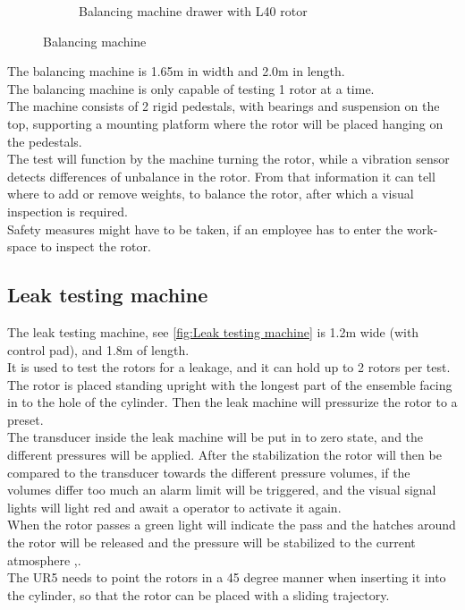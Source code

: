 \begin{figure}[H]
\begin{subfigure}{.49\textwidth}
        \caption{Balancing machine drawer with L40 rotor}
        \label{fig:Rotor} 
    \end{subfigure}
\caption{Balancing machine\cite{Case}}
\label{fig:BalancingMachine}
\end{figure}

 The balancing machine is 1.65m in width and 2.0m in length.\\
 The balancing machine is only capable of testing 1 rotor at a time.\\
 The machine consists of 2 rigid pedestals, with bearings and suspension on the top, supporting a mounting platform where the rotor will be placed hanging on the pedestals. \\

The test will function by the machine turning the rotor, while a vibration sensor detects differences of unbalance in the rotor. From that information it can tell where to add or remove weights, to balance the rotor, after which a visual inspection is required. \\

Safety measures might have to be taken, if an employee has to enter the work-space to inspect the rotor. \\
 


 \subsection{Leak testing machine}
 
 The leak testing machine, see \ref{fig:Leak testing machine} is 1.2m wide (with control pad), and 1.8m of length.\\ 
 It is used to test the rotors for a leakage, and it can hold up to 2 rotors per test.\\
 The rotor is placed standing upright with the longest part of the ensemble facing in to the hole of the cylinder. Then the leak machine will pressurize the rotor to a preset.\\
 The transducer inside the leak machine will be put in to zero state, and the different pressures will be applied. After the stabilization the rotor will then be compared to the transducer towards the different pressure volumes, if the volumes differ too much an alarm limit will be triggered, and the visual signal lights will light red and await a operator to activate it again. \\
 When the rotor passes a green light will indicate the pass and the hatches around the rotor will be released and the pressure will be stabilized to the current atmosphere  \cite{LEAK},\cite{LEAK2}. \\
The UR5 needs to point the rotors in a 45 degree manner when inserting it into the cylinder, so that the rotor can be placed with a sliding trajectory. \\
 
